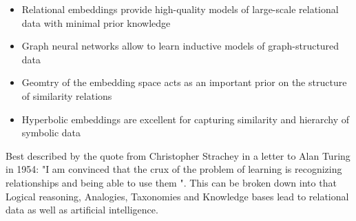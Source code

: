 \begin{itemize}
    \item Relational embeddings provide high-quality models of large-scale relational data with minimal prior knowledge
    \item Graph neural networks allow to learn inductive models of graph-structured data
    \item Geomtry of the embedding space acts as an important prior on the structure of similarity relations
    \item Hyperbolic embeddings are excellent for capturing similarity and hierarchy of symbolic data
\end{itemize}

Best described by the quote from Christopher Strachey in a letter to Alan Turing in 1954: "I am convinced that the crux of the problem of learning is recognizing relationships and being able to use them ". This can be broken down into that Logical reasoning, Analogies, Taxonomies and Knowledge bases lead to relational data as well as artificial intelligence.
